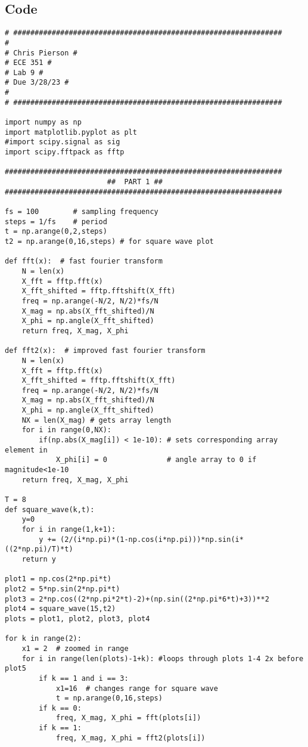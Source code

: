 \newpage
\subsection{Code}

\begin{scriptsize}
\begin{lstlisting}
# ###############################################################
# 
# Chris Pierson #
# ECE 351 #
# Lab 9 #
# Due 3/28/23 #
# 
# ###############################################################

import numpy as np
import matplotlib.pyplot as plt
#import scipy.signal as sig
import scipy.fftpack as fftp

#################################################################
                        ##  PART 1 ##
#################################################################

fs = 100        # sampling frequency
steps = 1/fs    # period
t = np.arange(0,2,steps)
t2 = np.arange(0,16,steps) # for square wave plot

def fft(x):  # fast fourier transform
    N = len(x)
    X_fft = fftp.fft(x)
    X_fft_shifted = fftp.fftshift(X_fft)
    freq = np.arange(-N/2, N/2)*fs/N 
    X_mag = np.abs(X_fft_shifted)/N
    X_phi = np.angle(X_fft_shifted)
    return freq, X_mag, X_phi

def fft2(x):  # improved fast fourier transform
    N = len(x)
    X_fft = fftp.fft(x)
    X_fft_shifted = fftp.fftshift(X_fft)
    freq = np.arange(-N/2, N/2)*fs/N
    X_mag = np.abs(X_fft_shifted)/N
    X_phi = np.angle(X_fft_shifted)
    NX = len(X_mag) # gets array length
    for i in range(0,NX):
        if(np.abs(X_mag[i]) < 1e-10): # sets corresponding array element in 
            X_phi[i] = 0              # angle array to 0 if magnitude<1e-10  
    return freq, X_mag, X_phi

T = 8
def square_wave(k,t):
    y=0
    for i in range(1,k+1):
        y += (2/(i*np.pi)*(1-np.cos(i*np.pi)))*np.sin(i*((2*np.pi)/T)*t)
    return y

plot1 = np.cos(2*np.pi*t)
plot2 = 5*np.sin(2*np.pi*t)
plot3 = 2*np.cos((2*np.pi*2*t)-2)+(np.sin((2*np.pi*6*t)+3))**2
plot4 = square_wave(15,t2)
plots = plot1, plot2, plot3, plot4

for k in range(2):
    x1 = 2  # zoomed in range  
    for i in range(len(plots)-1+k): #loops through plots 1-4 2x before plot5
        if k == 1 and i == 3: 
            x1=16  # changes range for square wave
            t = np.arange(0,16,steps)
        if k == 0:
            freq, X_mag, X_phi = fft(plots[i]) 
        if k == 1:
            freq, X_mag, X_phi = fft2(plots[i])
            

\end{lstlisting}
\end{scriptsize}
